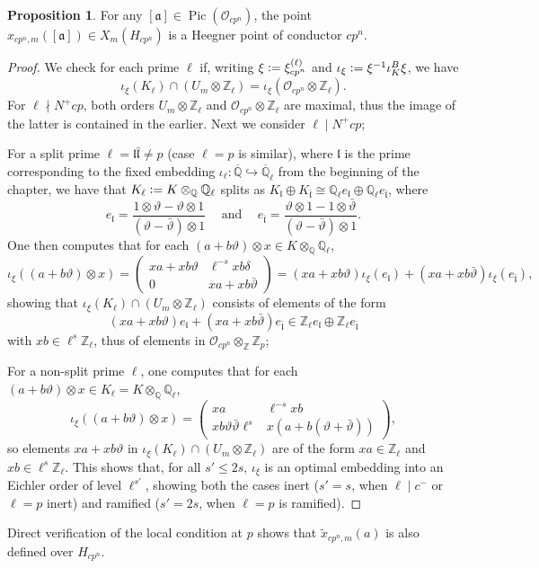 \documentclass[a4paper]{amsart}
\numberwithin{equation}{section}
\theoremstyle{definition}
\newtheorem{proposition}[theorem]{Proposition}
\newcommand{\Q}{\mathbb{Q}}
\newcommand{\Z}{\mathbb{Z}}
\newcommand{\defeq}{\vcentcolon=}
\DeclareMathOperator{\Pic}{Pic}
\begin{document}
\begin{proposition}\label{prop.HeegnerPoint}
For any $[\mathfrak{a}]\in\Pic(\mathcal{O}_{cp^n})$, the point $x_{cp^n,m}([\mathfrak{a}])\in X_m(H_{cp^n})$ is a Heegner point of conductor $cp^n$.
\end{proposition}
\begin{proof}
We check for each prime $\ell$ if, writing $\xi\defeq \xi_{cp^n}^{(\ell)}$ and $\iota_\xi\defeq \xi^{-1}\iota_K^B\xi$, we have \[\iota_\xi(K_\ell)\cap (U_m\otimes\Z_\ell) = \iota_\xi(\mathcal{O}_{cp^n}\otimes \Z_\ell).\]
For $\ell\nmid N^+cp$, both orders $U_m\otimes\Z_\ell$ and $\mathcal{O}_{cp^n}\otimes \Z_\ell$ are maximal, thus the image of the latter is contained in the earlier. Next we consider $\ell\mid N^+cp$;

For a split prime $\ell=\mathfrak{l}\bar{\mathfrak{l}}\neq p$ (case $\ell=p$ is similar), where $\mathfrak{l}$ is the prime corresponding to the fixed embedding $\iota_\ell\colon\overline{\Q}\hookrightarrow\overline{\Q}_\ell$ from the beginning of the chapter, we have that $K_\ell\defeq K\otimes_{\Q}\Q_\ell$ splits as $K_\mathfrak{l}\oplus K_{\bar{\mathfrak{l}}}\cong\Q_\ell e_{\mathfrak{l}}\oplus\Q_\ell e_{\bar{\mathfrak{l}}}$, where \[ e_\mathfrak{l}=\frac{1\otimes\vartheta-\vartheta\otimes1}{(\vartheta-\bar{\vartheta})\otimes 1}\hspace{15pt}\text{and}\hspace{15pt}e_{\bar{\mathfrak{l}}}=\frac{\vartheta\otimes 1-1\otimes\bar{\vartheta}}{(\vartheta-\bar{\vartheta})\otimes1}.\] One then computes that for each $(a+b\vartheta)\otimes x\in K\otimes_\Q\Q_\ell$,
\[\iota_\xi((a+b\vartheta)\otimes x)=\begin{pmatrix}xa+xb\vartheta & \ell^{-s}xb\delta \\ 0 & xa+xb\bar{\vartheta}\end{pmatrix}=(xa+xb\vartheta)\iota_\xi(e_\mathfrak{l})+(xa+xb\bar{\vartheta})\iota_\xi(e_{\bar{\mathfrak{l}}}),\]
showing that $\iota_\xi(K_\ell)\cap (U_m\otimes\Z_\ell)$ consists of elements of the form \[(xa+xb\vartheta)e_\mathfrak{l}+(xa+xb\bar{\vartheta})e_{\bar{\mathfrak{l}}}\in\Z_\ell e_\mathfrak{l}\oplus\Z_\ell e_{\bar{\mathfrak{l}}}\] with $xb\in\ell^s\Z_\ell$, thus of elements in $\mathcal{O}_{cp^n}\otimes_\Z\Z_p$;

For a non-split prime $\ell$, one computes that for each $(a+b\vartheta)\otimes x\in K_\ell=K\otimes_\Q\Q_\ell$, \[\iota_\xi((a+b\vartheta)\otimes x)=\begin{pmatrix}xa & \ell^{-s}xb \\ xb\vartheta\bar{\vartheta}\ell^s & x(a+b(\vartheta+\bar{\vartheta}))\end{pmatrix},\] so elements $xa+xb\vartheta$ in $\iota_\xi(K_\ell)\cap (U_m\otimes\Z_\ell)$ are of the form $xa\in\Z_\ell$ and $xb\in\ell^s\Z_\ell$. This shows that, for all $s'\leq 2s$, $\iota_\xi$ is an optimal embedding into an Eichler order of level $\ell^{s'}$, showing both the cases inert ($s'=s$, when $\ell\mid c^{-}$ or $\ell=p$ inert) and ramified ($s'=2s$, when $\ell=p$ is ramified).\qedhere
\end{proof}
Direct verification of the local condition at $p$ shows that $\widetilde{x}_{cp^n,m}(a)$ is also defined over $H_{cp^n}$.
\end{document}
